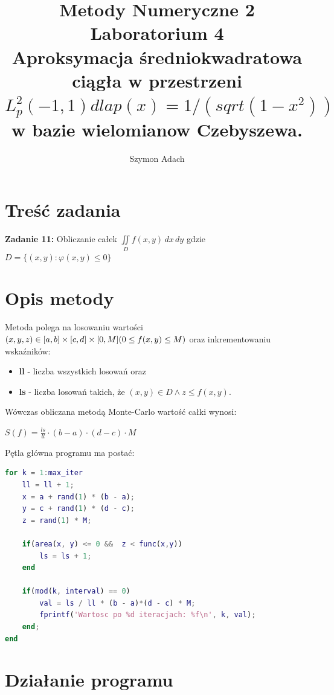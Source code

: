 \documentclass[]{article}
\title{\textbf{ Metody Numeryczne 2\\Laboratorium 4\\}
Aproksymacja średniokwadratowa ciągła w przestrzeni $L_p^2(-1,1) dla p(x)=1/(sqrt(1-x^2))$ w bazie wielomianow Czebyszewa. }
\author{Szymon Adach}
\begin{document}
\maketitle


\section{Treść zadania}
 \textbf{Zadanie 11:} Obliczanie całek ${\displaystyle \iint\limits_D f(x,y) \,dx\,dy}$ gdzie $D=\{(x,y) : \varphi(x,y) \leqslant 0\}$
\section{Opis metody}
Metoda polega na losowaniu wartości $(x, y, z) \in [a, b] \times [c, d] \times [0, M] \\(0 \leq f(x,y) \leq M)$ oraz inkrementowaniu wskaźników: 
\begin{itemize}
	\item \textbf{ll} - liczba wszystkich losowań oraz 
	\item \textbf{ls} - liczba losowań takich, że $(x,y) \in D \land z \leq f(x,y)$.
\end{itemize}
Wówczas obliczana metodą Monte-Carlo wartość całki wynosi:
\begin{center}
	$S(f) = \frac{ls}{ll}\cdot(b-a)\cdot(d-c)\cdot M$
\end{center}
Pętla główna programu ma postać:
\begin{lstlisting}[mathescape, language=Matlab]
for k = 1:max_iter
	ll = ll + 1;
	x = a + rand(1) * (b - a);
	y = c + rand(1) * (d - c);
	z = rand(1) * M;
	
	if(area(x, y) <= 0 &&  z < func(x,y))
		ls = ls + 1;
	end
	
	if(mod(k, interval) == 0)
		val = ls / ll * (b - a)*(d - c) * M;
		fprintf('Wartosc po %d iteracjach: %f\n', k, val);
	end;
end
\end{lstlisting}
\section{Działanie programu}
\end{document}

